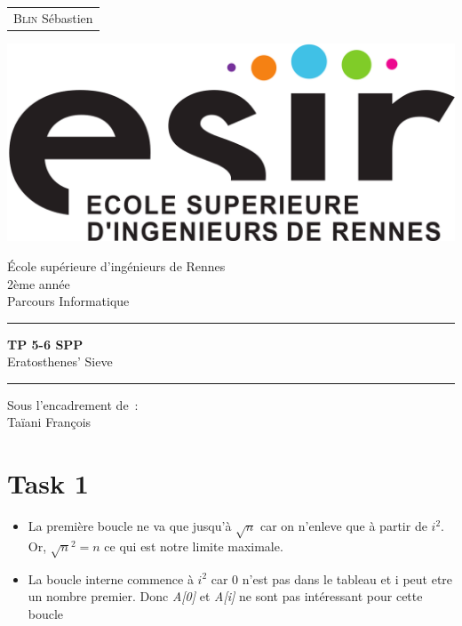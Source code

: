 \documentclass{article}
\begin{document}
	\begin{titlepage}
		\vspace{-20px}
		\begin{tabular}{l}
			\textsc{Blin} Sébastien
		\end{tabular}
		\hfill \vspace{10px}\includegraphics[scale=0.1]{esir}\\
		\vfill
		\begin{center}
			\Huge{\'Ecole sup\'erieure d'ing\'enieurs de Rennes}\\
			\vspace{1cm}
			\LARGE{2ème année}\\
			\large{Parcours Informatique}\\
			\vspace{0.5cm}\hrule\vspace{0.5cm}
			\LARGE{\textbf{TP 5-6 SPP}}\\
			\Large{Eratosthenes' Sieve}
			\vspace{0.5cm}\hrule
			\vfill
			\vfill
		\end{center}
		\begin{flushleft}
			\Large{Sous l'encadrement de~:}\\
			\vspace{0.2cm}
			\large{{Taïani} François}
		\end{flushleft}
		\vfill
	\end{titlepage}

\section{Task 1}
\label{sec:Task 1}

\begin{itemize}
	\item La première boucle ne va que jusqu'à $\sqrt{n}$ car on n'enleve que à partir de $i^2$. Or, $\sqrt{n}^2=n$ ce qui est notre limite maximale.
	\item La boucle interne commence à $i^2$ car 0 n'est pas dans le tableau et i peut etre un nombre premier. Donc \emph{A[0]} et \emph{A[i]} ne sont pas intéressant pour cette boucle
\end{itemize}
\end{document}
